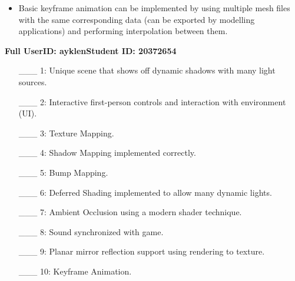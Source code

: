 \documentclass {article}
\begin{document}
\begin{description}
\begin{itemize}
      \item
        Basic keyframe animation can be implemented by using multiple mesh files with the same corresponding data (can be exported by modelling applications) and performing interpolation between them.

    \end{itemize}

    \newpage


    \nocite{*}
    {}
    

\end{description}
\newpage



{\hfill{\bf Full UserID: ayklen}\hfill{\bf Student ID: 20372654}\hfill}

\begin{enumerate}
  \item[\_\_\_ 1:]  Unique scene that shows off dynamic shadows with many light sources.

  \item[\_\_\_ 2:]  Interactive first-person controls and interaction with environment (UI).

  \item[\_\_\_ 3:]  Texture Mapping.

  \item[\_\_\_ 4:]  Shadow Mapping implemented correctly.

  \item[\_\_\_ 5:]  Bump Mapping.

  \item[\_\_\_ 6:]  Deferred Shading implemented to allow many dynamic lights.

  \item[\_\_\_ 7:]  Ambient Occlusion using a modern shader technique.

  \item[\_\_\_ 8:]  Sound synchronized with game.

  \item[\_\_\_ 9:]  Planar mirror reflection support using rendering to texture.

  \item[\_\_\_ 10:] Keyframe Animation.
\end{enumerate}

\end{document}
